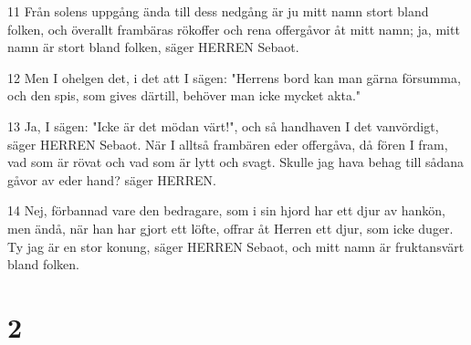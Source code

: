 \par 11 Från solens uppgång ända till dess nedgång är ju mitt namn stort bland folken, och överallt frambäras rökoffer och rena offergåvor åt mitt namn; ja, mitt namn är stort bland folken, säger HERREN Sebaot.
\par 12 Men I ohelgen det, i det att I sägen: "Herrens bord kan man gärna försumma, och den spis, som gives därtill, behöver man icke mycket akta."
\par 13 Ja, I sägen: "Icke är det mödan värt!", och så handhaven I det vanvördigt, säger HERREN Sebaot. När I alltså frambären eder offergåva, då fören I fram, vad som är rövat och vad som är lytt och svagt. Skulle jag hava behag till sådana gåvor av eder hand? säger HERREN.
\par 14 Nej, förbannad vare den bedragare, som i sin hjord har ett djur av hankön, men ändå, när han har gjort ett löfte, offrar åt Herren ett djur, som icke duger. Ty jag är en stor konung, säger HERREN Sebaot, och mitt namn är fruktansvärt bland folken.

\chapter{2}

